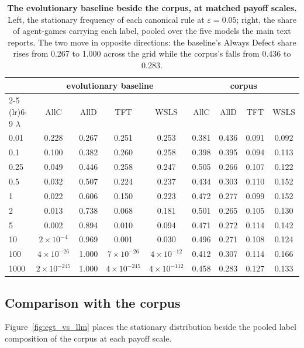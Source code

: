 \documentclass[11pt,a4paper]{article}
\newcommand{\lam}{\lambda}
\begin{document}
\begin{table}[htbp]
\centering
\footnotesize
\setlength{\tabcolsep}{4pt}
\caption{\textbf{The evolutionary baseline beside the corpus, at matched payoff scales.} Left, the stationary frequency of each canonical rule at $\varepsilon = 0.05$; right, the share of agent-games carrying each label, pooled over the five models the main text reports. The two move in opposite directions: the baseline's Always Defect share rises from 0.267 to 1.000 across the grid while the corpus's falls from 0.436 to 0.283.}
\label{tab:C-egt-vs-llm}
\begin{tabular}{@{}lcccccccc@{}}
\toprule
& \multicolumn{4}{c}{evolutionary baseline} & \multicolumn{4}{c}{corpus} \\
\cmidrule(lr){2-5} \cmidrule(lr){6-9}
$\lam$ & AllC & AllD & TFT & WSLS & AllC & AllD & TFT & WSLS \\
\midrule
0.01 & 0.228 & 0.267 & 0.251 & 0.253 & 0.381 & 0.436 & 0.091 & 0.092 \\
0.1 & 0.100 & 0.382 & 0.260 & 0.258 & 0.398 & 0.395 & 0.094 & 0.113 \\
0.25 & 0.049 & 0.446 & 0.258 & 0.247 & 0.505 & 0.266 & 0.107 & 0.122 \\
0.5 & 0.032 & 0.507 & 0.224 & 0.237 & 0.434 & 0.303 & 0.110 & 0.152 \\
1 & 0.022 & 0.606 & 0.150 & 0.223 & 0.472 & 0.277 & 0.099 & 0.152 \\
2 & 0.013 & 0.738 & 0.068 & 0.181 & 0.501 & 0.265 & 0.105 & 0.130 \\
5 & 0.002 & 0.894 & 0.010 & 0.094 & 0.471 & 0.272 & 0.114 & 0.142 \\
10 & $2\!\times\!10^{-4}$ & 0.969 & 0.001 & 0.030 & 0.496 & 0.271 & 0.108 & 0.124 \\
100 & $4\!\times\!10^{-26}$ & 1.000 & $7\!\times\!10^{-26}$ & $4\!\times\!10^{-12}$ & 0.412 & 0.307 & 0.114 & 0.166 \\
1000 & $2\!\times\!10^{-245}$ & 1.000 & $4\!\times\!10^{-245}$ & $4\!\times\!10^{-112}$ & 0.458 & 0.283 & 0.127 & 0.133 \\
\bottomrule
\end{tabular}
\end{table}


\subsection{Comparison with the corpus}\label{appendix:egt_vs_llm}

Figure~\ref{fig:egt_vs_llm} places the stationary distribution beside the pooled label composition of the corpus at each payoff scale.
\end{document}
